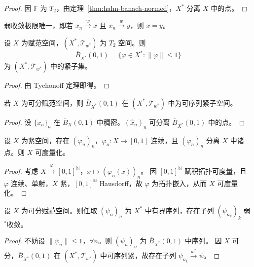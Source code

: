 \documentclass[lang=cn,a4paper,newtx,section]{elegantbook}
\begin{document}
\begin{proof}
  因 $\mathbb{F}$ 为 $T_2$，由定理~\ref{thm:hahn-banach-normed}，$X^*$ 分离 $X$ 中的点。
\end{proof}

\begin{corollary}
  弱收敛极限唯一，即若 $x_n\xrightarrow{w}x$ 且 $x_n\xrightarrow{w}y$，则 $x=y$。
\end{corollary}

\begin{theorem}
  设 $X$ 为赋范空间，$(X^*,\mathcal{T}_{w^*})$ 为 $T_2$ 空间。则
  \[
    \overline{B}_{X^*}(0,1)=\{\varphi\in X^*:\|\varphi\|\le 1\}
  \]
  为 $(X^*,\mathcal{T}_{w^*})$ 中的紧子集。
\end{theorem}

\begin{proof}
  由 Tychonoff 定理即得。
\end{proof}

\begin{corollary}
  若 $X$ 为可分赋范空间，则 $\overline{B}_{X^*}(0,1)$ 在 $(X^*,\mathcal{T}_{w^*})$ 中为可序列紧子空间。
\end{corollary}

\begin{proof}
  设 $\{x_n\}_n$ 在 $\overline{B}_X(0,1)$ 中稠密。$(\hat{x}_n)_n$ 可分离 $\overline{B}_{X^*}(0,1)$ 中的点。
\end{proof}

\begin{lemma}\label{lem:metrizable}
  设 $X$ 为紧空间，存在 $(\varphi_n)_n$，$\varphi_n:X\to[0,1]$ 连续，且 $(\varphi_n)_n$ 分离 $X$ 中诸点。则 $X$ 可度量化。
\end{lemma}

\begin{proof}
  考虑 $X\xrightarrow{\varphi}[0,1]^{\mathbb{N}}$，$x\mapsto(\varphi_n(x))_n$。
  因 $[0,1]^{\mathbb{N}}$ 赋积拓扑可度量，且 $\varphi$ 连续、单射，$X$ 紧，$[0,1]^{\mathbb{N}}$ Hausdorff，故 $\varphi$ 为拓扑嵌入，从而 $X$ 可度量化。
\end{proof}

\begin{theorem}
  设 $X$ 为可分赋范空间。则任取 $(\psi_n)_n$ 为 $X^*$ 中有界序列，存在子列 $(\psi_{n_k})_k$ 弱$^*$收敛。
\end{theorem}

\begin{proof}
  不妨设 $\|\psi_n\|\le 1$，$\forall n$。则 $(\psi_n)_n$ 为 $\overline{B}_{X^*}(0,1)$ 中序列。
  因 $X$ 可分，$\overline{B}_{X^*}(0,1)$ 在 $(X^*,\mathcal{T}_{w^*})$ 中可序列紧，故存在子列 $\psi_{n_k}\xrightarrow{w^*}\psi$。
\end{proof}
\end{document}
